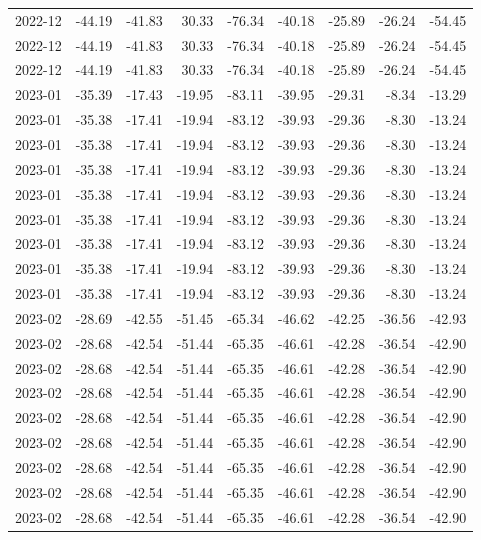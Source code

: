 \begin{table}[ht]
\begin{tabular}{lrrrrrrrr}
  2022-12 & -44.19 & -41.83 & 30.33 & -76.34 & -40.18 & -25.89 & -26.24 & -54.45 \\ 
  2022-12 & -44.19 & -41.83 & 30.33 & -76.34 & -40.18 & -25.89 & -26.24 & -54.45 \\ 
  2022-12 & -44.19 & -41.83 & 30.33 & -76.34 & -40.18 & -25.89 & -26.24 & -54.45 \\ 
  2023-01 & -35.39 & -17.43 & -19.95 & -83.11 & -39.95 & -29.31 & -8.34 & -13.29 \\ 
  2023-01 & -35.38 & -17.41 & -19.94 & -83.12 & -39.93 & -29.36 & -8.30 & -13.24 \\ 
  2023-01 & -35.38 & -17.41 & -19.94 & -83.12 & -39.93 & -29.36 & -8.30 & -13.24 \\ 
  2023-01 & -35.38 & -17.41 & -19.94 & -83.12 & -39.93 & -29.36 & -8.30 & -13.24 \\ 
  2023-01 & -35.38 & -17.41 & -19.94 & -83.12 & -39.93 & -29.36 & -8.30 & -13.24 \\ 
  2023-01 & -35.38 & -17.41 & -19.94 & -83.12 & -39.93 & -29.36 & -8.30 & -13.24 \\ 
  2023-01 & -35.38 & -17.41 & -19.94 & -83.12 & -39.93 & -29.36 & -8.30 & -13.24 \\ 
  2023-01 & -35.38 & -17.41 & -19.94 & -83.12 & -39.93 & -29.36 & -8.30 & -13.24 \\ 
  2023-01 & -35.38 & -17.41 & -19.94 & -83.12 & -39.93 & -29.36 & -8.30 & -13.24 \\ 
  2023-02 & -28.69 & -42.55 & -51.45 & -65.34 & -46.62 & -42.25 & -36.56 & -42.93 \\ 
  2023-02 & -28.68 & -42.54 & -51.44 & -65.35 & -46.61 & -42.28 & -36.54 & -42.90 \\ 
  2023-02 & -28.68 & -42.54 & -51.44 & -65.35 & -46.61 & -42.28 & -36.54 & -42.90 \\ 
  2023-02 & -28.68 & -42.54 & -51.44 & -65.35 & -46.61 & -42.28 & -36.54 & -42.90 \\ 
  2023-02 & -28.68 & -42.54 & -51.44 & -65.35 & -46.61 & -42.28 & -36.54 & -42.90 \\ 
  2023-02 & -28.68 & -42.54 & -51.44 & -65.35 & -46.61 & -42.28 & -36.54 & -42.90 \\ 
  2023-02 & -28.68 & -42.54 & -51.44 & -65.35 & -46.61 & -42.28 & -36.54 & -42.90 \\ 
  2023-02 & -28.68 & -42.54 & -51.44 & -65.35 & -46.61 & -42.28 & -36.54 & -42.90 \\ 
  2023-02 & -28.68 & -42.54 & -51.44 & -65.35 & -46.61 & -42.28 & -36.54 & -42.90 \\ 

\end{tabular}
\end{table}
